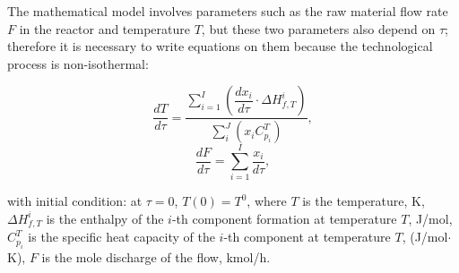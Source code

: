 \documentclass[mathematics,article,accept,pdftex,moreauthors]{Definitions/mdpi}
\begin{document}
	The mathematical model involves parameters such as the raw material flow rate $F$ in the reactor and temperature $T$, but these two parameters also depend on $\tau$; therefore it is necessary to write equations on them because the technological process is non-isothermal:
	\begin{linenomath}
		\begin{equation}\label{eq_temper}
			\dfrac{dT}{d\tau} = \dfrac{\sum_{i=1}^I\left( \dfrac{dx_i}{d\tau} \cdot \Delta H^i_{f,T} \right) }{\sum_i^J \left(x_i C^T_{p_i} \right) },
		\end{equation}
		\begin{equation}\label{eq_flow}
			\dfrac{dF}{d\tau} = \sum_{i=1}^I  \dfrac{x_i}{d\tau},
		\end{equation}
	\end{linenomath}
	with initial condition: at $\tau = 0$, $T(0) = T^0$, where $T$ is the temperature, K, $\Delta H^i_{f,T}$ is the enthalpy of the $i$-th component formation at temperature $T$, J/mol, $C^T_{p_i}$ is the specific heat capacity of the $i$-th component at temperature $T$, (J/mol$\cdot$K), $F$ is the mole discharge of the flow, kmol/h.
	
\end{document}
